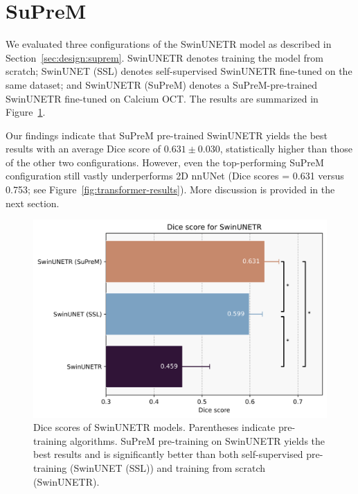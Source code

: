 \documentclass[a4paper,11pt,oneside]{report}
\begin{document}
\section{SuPreM}
We evaluated three configurations of the SwinUNETR model as described in Section~\ref{sec:design:suprem}. SwinUNETR denotes training the model from scratch; SwinUNET (SSL) denotes self-supervised SwinUNETR fine-tuned on the same dataset; and SwinUNETR (SuPreM) denotes a SuPreM-pre-trained SwinUNETR fine-tuned on Calcium OCT. The results are summarized in Figure~\ref{fig:suprem-results}. 

Our findings indicate that SuPreM pre-trained SwinUNETR yields the best results with an average Dice score of $0.631\pm0.030$, statistically higher than those of the other two configurations. However, even the top-performing SuPreM configuration still vastly underperforms 2D nnUNet (Dice scores = 0.631 versus 0.753; see Figure~\ref{fig:transformer-results}). More discussion is provided in the next section. %

\begin{figure}[hbt]
    \centering
    \includegraphics[width=0.5\linewidth]{figures/result_SwinUNETR_results.png}
    \caption{Dice scores of SwinUNETR models. Parentheses indicate pre-training algorithms. SuPreM pre-training on SwinUNETR yields the best results and is significantly better than both self-supervised pre-training (SwinUNET (SSL)) and training from scratch (SwinUNETR).}
    \label{fig:suprem-results}
\end{figure}
\end{document}
